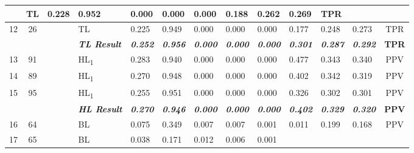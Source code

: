 \begin{table}[H]
{\begin{tabular}{ccc|l|l|l|l|l|l|l|l|l|c|}
    \cellcolor[HTML]{00A9CE}{\color[HTML]{FFFFFF} RB} &
    TL &
    0.228 &
    0.952 &
    0.000 &
    0.000 &
    0.000 &
    0.188 &
    0.262 &
    0.269 &
    TPR \\ \hline
  \multicolumn{1}{|c|}{12} &
    \multicolumn{1}{c|}{26} &
    \cellcolor[HTML]{00A9CE}{\color[HTML]{FFFFFF} RB} &
    TL &
    0.225 &
    0.949 &
    0.000 &
    0.000 &
    0.000 &
    0.177 &
    0.248 &
    0.273 &
    TPR \\ \hline
   &
     &
    {\color[HTML]{FFFFFF} } &
    \textit{\textbf{TL Result}} &
    \textit{\textbf{0.252}} &
    \textit{\textbf{0.956}} &
    \textit{\textbf{0.000}} &
    \textit{\textbf{0.000}} &
    \textit{\textbf{0.000}} &
    \textit{\textbf{0.301}} &
    \textit{\textbf{0.287}} &
    \textit{\textbf{0.292}} &
    \textbf{TPR} \\ \hline
  \multicolumn{1}{|c|}{13} &
    \multicolumn{1}{c|}{91} &
    \cellcolor[HTML]{99DDFD}{\color[HTML]{FFFFFF} BB} &
    HL\textsubscript{1} &
    0.283 &
    0.940 &
    0.000 &
    0.000 &
    0.000 &
    0.477 &
    0.343 &
    0.340 &
    PPV \\ \hline
  \multicolumn{1}{|c|}{14} &
    \multicolumn{1}{c|}{89} &
    \cellcolor[HTML]{99DDFD}{\color[HTML]{FFFFFF} BB} &
    HL\textsubscript{1} &
    0.270 &
    0.948 &
    0.000 &
    0.000 &
    0.000 &
    0.402 &
    0.342 &
    0.319 &
    PPV \\ \hline
  \multicolumn{1}{|c|}{15} &
    \multicolumn{1}{c|}{95} &
    \cellcolor[HTML]{99DDFD}{\color[HTML]{FFFFFF} BB} &
    HL\textsubscript{1} &
    0.255 &
    0.951 &
    0.000 &
    0.000 &
    0.000 &
    0.326 &
    0.302 &
    0.301 &
    PPV \\ \hline
   &
     &
    {\color[HTML]{FFFFFF} } &
    \textit{\textbf{HL Result}} &
    \textit{\textbf{0.270}} &
    \textit{\textbf{0.946}} &
    \textit{\textbf{0.000}} &
    \textit{\textbf{0.000}} &
    \textit{\textbf{0.000}} &
    \textit{\textbf{0.402}} &
    \textit{\textbf{0.329}} &
    \textit{\textbf{0.320}} &
    \textbf{PPV} \\ \hline
  \multicolumn{1}{|c|}{16} &
    \multicolumn{1}{c|}{64} &
    \cellcolor[HTML]{99DDFD}{\color[HTML]{FFFFFF} BB} &
    BL &
    0.075 &
    0.349 &
    0.007 &
    0.007 &
    0.001 &
    0.011 &
    0.199 &
    0.168 &
    PPV \\ \hline
  \multicolumn{1}{|c|}{17} &
    \multicolumn{1}{c|}{65} &
    \cellcolor[HTML]{99DDFD}{\color[HTML]{FFFFFF} BB} &
    BL &
    0.038 &
    0.171 &
    0.012 &
    0.006 &
    0.001 &

\end{tabular}}
\end{table}
